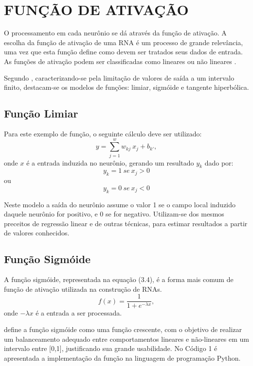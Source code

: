 \section{FUNÇÃO DE ATIVAÇÃO}\label{sec:funcao-ativacao}
O processamento em cada neurônio se dá através da função de ativação. A escolha da função de ativação de uma RNA é um processo de grande relevância, uma vez que esta função define como devem ser tratados seus dados de entrada. As funções de ativação podem ser classificadas como lineares ou não lineares \cite{haykin2000}.

Segundo , caracterizando-se pela limitação de valores de saída a um intervalo finito, destacam-se os modelos de funções: limiar, sigmóide e tangente hiperbólica.

\subsection{Função Limiar}
Para este exemplo de função, o seguinte cálculo deve ser utilizado:
\begin{equation}\label{eq:limiar}
y=\sum_{j=1}^{w} w_{kj}\ x_j + b_{k'},
\end{equation}
onde $x$ é a entrada induzida no neurônio, gerando um resultado $y_k$ dado por:
\begin{equation}\label{eq:limiar-result} 
y_k = {1\ se\ x_j  > 0}
\end{equation}
ou
\begin{equation}\label{eq:limiar-result} 
y_k = {0\ se\ x_j < 0}  
\end{equation}

Neste modelo a saída do neurônio assume o valor 1 se o campo local induzido daquele neurônio for positivo, e 0 se for negativo. Utilizam-se dos mesmos preceitos de regressão linear e de outras técnicas, para estimar resultados a partir de valores conhecidos.

\subsection{Função Sigmóide}
A função sigmóide, representada na equação (3.4), é a forma mais comum de função de ativação utilizada na construção de RNAs.
\begin{equation}\label{eq:limiar-result} 
f(x)=\frac{1}{1+e^{- \lambda x}} ,
\end{equation}
onde $- \lambda x$ é a entrada a ser processada.

 define a função sigmóide como uma função crescente, com o objetivo de realizar um balanceamento adequado entre comportamentos lineares e não-lineares em um intervalo entre [0,1], justificando sua grande usabilidade. No Código 1 é apresentada a implementação da função na linguagem de programação Python.

